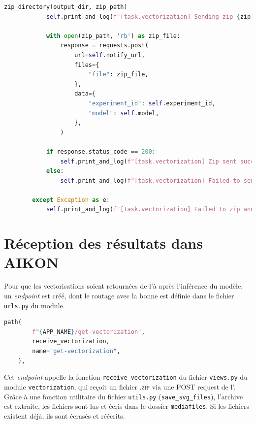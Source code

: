 \begin{lstlisting}[language=python, frame=single, breaklines=true, caption={Classe \texttt{ComputeVectorization}.}]
            zip_directory(output_dir, zip_path)
            self.print_and_log(f"[task.vectorization] Sending zip {zip_path} to {self.notify_url}", color="blue")

            with open(zip_path, 'rb') as zip_file:
                response = requests.post(
                    url=self.notify_url,
                    files={
                        "file": zip_file,
                    },
                    data={
                        "experiment_id": self.experiment_id,
                        "model": self.model,
                    },
                )
            
            if response.status_code == 200:
                self.print_and_log(f"[task.vectorization] Zip sent successfully to {self.notify_url}", color="yellow")
            else:
                self.print_and_log(f"[task.vectorization] Failed to send zip to {self.notify_url}. Status code: {response.status_code}", color="red")
        
        except Exception as e:
            self.print_and_log(f"[task.vectorization] Failed to zip and send directory {output_dir}", e)
	\end{lstlisting}

\section{Réception des résultats dans AIKON}

Pour que les vectorisations soient retournées de l'\api à \aikon après l'inférence du modèle, un \textit{endpoint} est créé, dont le routage avec la bonne \URL est définie dans le fichier \texttt{urls.py} du module.

\begin{lstlisting}[language=python, frame=single, breaklines=true, caption={Routage de l'\textit{endpoint} pour la réception de vectorisations.}]
 path(
        f"{APP_NAME}/get-vectorization",
        receive_vectorization,
        name="get-vectorization",
    ),\end{lstlisting}

Cet \textit{endpoint} appelle la fonction \texttt{receive\_vectorization} du fichier \texttt{views.py} du module \texttt{vectorization}, qui reçoit un fichier .\textsc{zip} via une POST request de l'\api.  Grâce à une fonction utilitaire du fichier \texttt{utils.py} (\texttt{save\_svg\_files}), l'archive est extraite, les fichiers sont lus et écris dans le dossier \texttt{mediafiles}. Si les fichiers existent déjà, ils sont écrasés et réécrits. 

